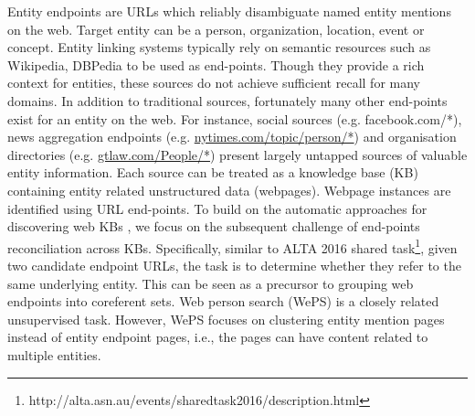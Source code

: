 \documentclass{sig-alternate-05-2015}
\begin{document}
Entity endpoints are URLs which reliably disambiguate named entity mentions on the web\cite{chisholm2016akbc}. Target entity can be a person, organization, location, event or concept. Entity linking systems typically rely on semantic resources such as Wikipedia, DBPedia to be used as end-points. Though they provide a rich context for entities, these sources do not achieve sufficient recall for many domains. In addition to traditional sources, fortunately many other end-points exist for an entity on the web. For instance,  social sources (e.g. facebook.com/*), news aggregation endpoints (e.g. \url{nytimes.com/topic/person/*}) and organisation directories (e.g. \url{gtlaw.com/People/*}) present largely untapped  sources of valuable entity information. Each source can be treated as a knowledge base (KB) containing entity related unstructured data (webpages). Webpage instances are identified using URL end-points. To build on the automatic approaches for discovering web KBs \cite{chisholm2016akbc}, we focus on the subsequent challenge of end-points reconciliation across KBs. Specifically, similar to ALTA 2016 shared task\footnote{http://alta.asn.au/events/sharedtask2016/description.html}, given two candidate endpoint URLs, the task is to determine whether they refer to the same underlying entity. This can be seen as a precursor to grouping web endpoints into coreferent sets. Web person search (WePS) is a closely related unsupervised task. However, WePS focuses on clustering entity mention pages instead of entity endpoint pages, i.e., the pages can have content related to multiple entities.
\end{document}

